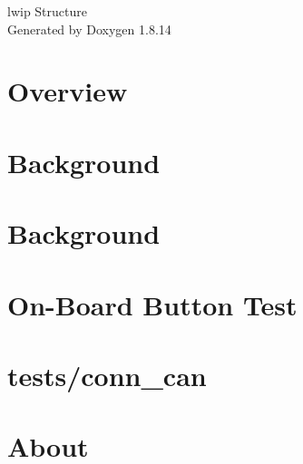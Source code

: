 \documentclass[twoside]{book}
\newcommand{\+}{\discretionary{\mbox{\scriptsize$\hookleftarrow$}}{}{}}
\newcommand{\clearemptydoublepage}{%
  \newpage{\pagestyle{empty}\cleardoublepage}%
}
\begin{document}
\hypersetup{pageanchor=false,
             bookmarksnumbered=true,
             pdfencoding=unicode
            }
\begin{titlepage}
\vspace*{7cm}
\begin{center}%
{\Large lwip Structure }\\
\vspace*{1cm}
{\large Generated by Doxygen 1.8.14}\\
\end{center}
\end{titlepage}
\clearemptydoublepage
{}
\tableofcontents
\clearemptydoublepage
{}
\hypersetup{pageanchor=true}

\chapter{Overview}
\label{index}\hypertarget{index}{}
\chapter{Background}
\label{md__home_ayush_RIOT_tests_board_calliope-mini_README}

\chapter{Background}
\label{md__home_ayush_RIOT_tests_board_microbit_README}

\chapter{On-\/\+Board Button Test}
\label{md__home_ayush_RIOT_tests_buttons_README}

\chapter{tests/conn\+\_\+can}
\label{md__home_ayush_RIOT_tests_conn_can_README}

\chapter{About}
\label{md__home_ayush_RIOT_tests_driver_adt7310_README}

\end{document}
